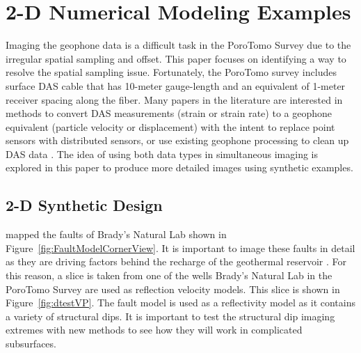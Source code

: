 \section{2-D Numerical Modeling Examples}
Imaging the geophone data is a difficult task in the PoroTomo Survey due to the irregular spatial sampling and offset. This paper focuses on identifying a way to resolve the spatial sampling issue. Fortunately, the PoroTomo survey includes surface DAS cable that has 10-meter gauge-length and an equivalent of 1-meter receiver spacing along the fiber. Many papers in the literature are interested in methods to convert DAS measurements (strain or strain rate) to a geophone equivalent (particle velocity or displacement) with the intent to replace point sensors with distributed sensors, or use existing geophone processing to clean up DAS data \citep{daley2013field,daley2015field,jreij2017field}. The idea of using both data types in simultaneous imaging is explored in this paper to produce more detailed images using synthetic examples.

\subsection{2-D Synthetic Design}
\citet{siler2013three} mapped the faults of Brady's Natural Lab shown in Figure~\ref{fig:FaultModelCornerView}. It is important to image these faults in detail as they are driving factors behind the recharge of the geothermal reservoir \citep{feigl2017overview,folsomimaging}. For this reason, a slice is taken from one of the wells Brady's Natural Lab \citep{siler2013three} in the PoroTomo Survey are used as reflection velocity models. This slice is shown in Figure~\ref{fig:dtestVP}. The \citet{siler2013three} fault model is used as a reflectivity model as it contains a variety of structural dips. It is important to test the structural dip imaging extremes with new methods to see how they will work in complicated subsurfaces.



